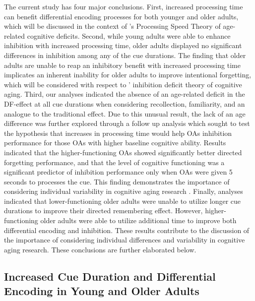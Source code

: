 \documentclass[man]{apa6}\usepackage[]{graphicx}\usepackage[]{color}
\begin{document}
The current study has four major conclusions. First, increased processing time can benefit differential encoding processes for both younger and older adults, which will be discussed in the context of \textcite{salthouse1996}'s Processing Speed Theory of age-related cognitive deficits. Second, while young adults were able to enhance inhibition with increased processing time, older adults displayed no significant differences in inhibition among any of the cue durations. The finding that older adults are unable to reap an inhibitory benefit with increased processing time implicates an inherent inability for older adults to improve intentional forgetting, which will be considered with respect to \textcite{hasher.zacks1988}' inhibition deficit theory of cognitive aging. Third, our analyses indicated the absence of an age-related deficit in the DF-effect at all cue durations when considering recollection, familiarity, and an analogue to the traditional effect. Due to this unusual result, the lack of an age difference was further explored through a follow up analysis which sought to test the hypothesis that increases in processing time would help OAs inhibition performance for those OAs with higher baseline cognitive ability. Results indicated that the higher-functioning OAs showed significantly better directed forgetting performance, and that the level of cognitive functioning was a significant predictor of inhibition performance only when OAs were given 5 seconds to processes the cue. This finding demonstrates the importance of considering individual variability in cognitive aging research \parencite{nelson.dannefer1992, christensen.et.al1994, morse1993,shammi.bosman.stuss1998,  christensen.et.al1999, anstey.christensen2000,  christensen2001}. Finally, analyses indicated that lower-functioning older adults were unable to utilize longer cue durations to improve their directed remembering effect. However, higher-functioning older adults were able to utilize additional time to improve both differential encoding and inhibition. These results contribute to the discussion of the importance of considering individual differences and variability in cognitive aging research. These conclusions are further elaborated below.

\subsection*{Increased Cue Duration and Differential Encoding in Young and Older Adults}
\end{document}
